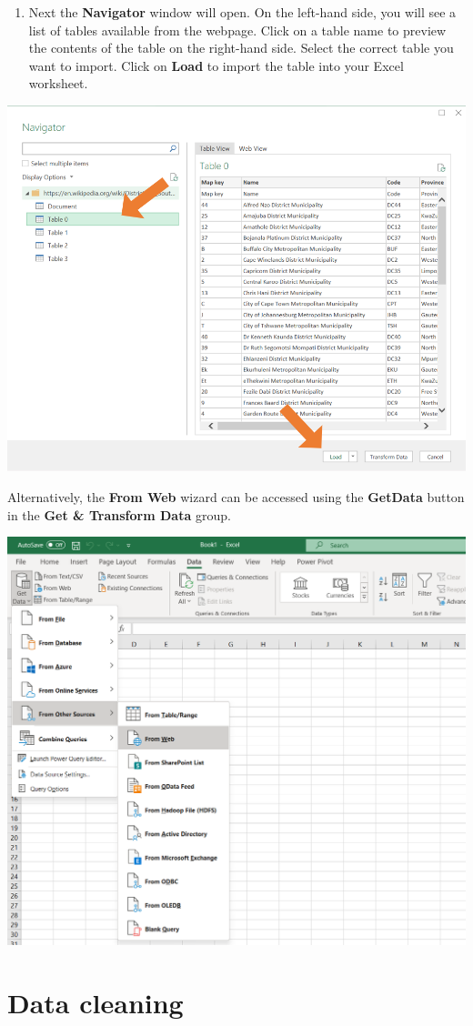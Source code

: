\documentclass[
]{book}
\providecommand{\tightlist}{%
  \setlength{\itemsep}{0pt}\setlength{\parskip}{0pt}}
\begin{document}
\begin{enumerate}
\def\labelenumi{\arabic{enumi}.}
\setcounter{enumi}{2}
\tightlist
\item
  Next the \textbf{Navigator} window will open. On the left-hand side, you will see a list of tables available from the webpage. Click on a table name to preview the contents of the table on the right-hand side. Select the correct table you want to import. Click on \textbf{Load} to import the table into your Excel worksheet.
\end{enumerate}

\begin{center}\includegraphics[width=0.7\linewidth]{Figures/web_3} \end{center}

Alternatively, the \textbf{From Web} wizard can be accessed using the \textbf{GetData} button in the \textbf{Get \& Transform Data} group.

\begin{center}\includegraphics[width=0.6\linewidth]{Figures/Section3-1} \end{center}

\section{Data cleaning}\label{data-cleaning}
\end{document}
